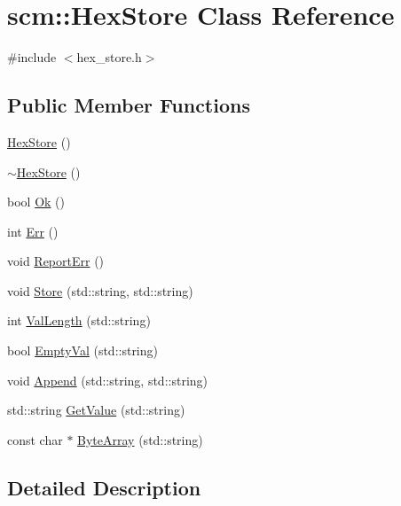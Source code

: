\hypertarget{classscm_1_1_hex_store}{
\section{scm::HexStore Class Reference}
\label{classscm_1_1_hex_store}
}


{\ttfamily \#include $<$hex\_\-store.h$>$}

\subsection*{Public Member Functions}
\begin{DoxyCompactItemize}
\item 
\hyperlink{classscm_1_1_hex_store_ae3ea77bf45ef55916e02aba5f5d280f5}{HexStore} ()
\item 
\hyperlink{classscm_1_1_hex_store_ac418965e7e9ee7569bb03b7230bad1bd}{$\sim$HexStore} ()
\item 
bool \hyperlink{classscm_1_1_hex_store_ae8d894818fe0859462b63f2e34d08a33}{Ok} ()
\item 
int \hyperlink{classscm_1_1_hex_store_a85cbfdc7f9a41355db174d3b96382d79}{Err} ()
\item 
void \hyperlink{classscm_1_1_hex_store_ac98d4c0f37c642e6b45262ec1db62d80}{ReportErr} ()
\item 
void \hyperlink{classscm_1_1_hex_store_aa1792118dbb32383976d6906c69c9e71}{Store} (std::string, std::string)
\item 
int \hyperlink{classscm_1_1_hex_store_a277a7c2220511ad3c0e447802589def1}{ValLength} (std::string)
\item 
bool \hyperlink{classscm_1_1_hex_store_a2c7a1fc73741e0b3613516388b562475}{EmptyVal} (std::string)
\item 
void \hyperlink{classscm_1_1_hex_store_ac086449d331c2e0dd6eaf11a003ffe99}{Append} (std::string, std::string)
\item 
std::string \hyperlink{classscm_1_1_hex_store_acdc20757093a52e3f7748dea41d185b2}{GetValue} (std::string)
\item 
const char $\ast$ \hyperlink{classscm_1_1_hex_store_a5e12c88428e17be9bb8f6c08ab107e57}{ByteArray} (std::string)
\end{DoxyCompactItemize}


\subsection{Detailed Description}


